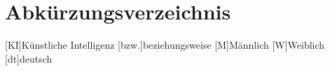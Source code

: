 
\chapter*{Abkürzungsverzeichnis}
%	
\begin{doublespace}
    
\begin{acronym}[YTMMM]
\setlength{\itemsep}{-\parsep}

[KI]{Künstliche Intelligenz}
[bzw.]{beziehungsweise}
[M]{Männlich}
[W]{Weiblich}
[dt]{deutsch}
\end{acronym}
    
\end{doublespace}